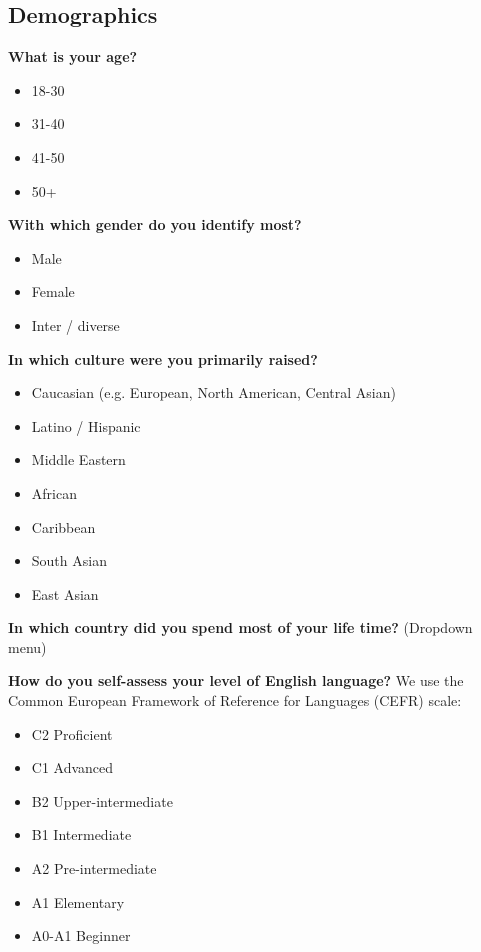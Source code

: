 \subsection{Demographics}
\textbf{What is your age?}
\begin{itemize}
	\item 18-30 
	\item 31-40
	\item 41-50
	\item 50+
\end{itemize}
\textbf{With which gender do you identify most?}
\begin{itemize}
	\item Male
	\item Female
	\item Inter / diverse
\end{itemize}
\textbf{In which culture were you primarily raised?}
\begin{itemize}
	\item Caucasian (e.g. European, North American, Central Asian)
	\item Latino / Hispanic
	\item Middle Eastern
	\item African
	\item Caribbean
	\item South Asian
	\item East Asian
\end{itemize}
\textbf{In which country did you spend most of your life time?}\newline
(Dropdown menu)\medskip \newline

\noindent \textbf{How do you self-assess your level of English language?}\newline
We use the Common European Framework of Reference for Languages (CEFR) scale:
\begin{itemize}
	\item C2	Proficient
	\item C1	Advanced
	\item B2	Upper-intermediate
	\item B1	Intermediate
	\item A2	Pre-intermediate
	\item A1	Elementary
	\item A0-A1	Beginner
\end{itemize}
